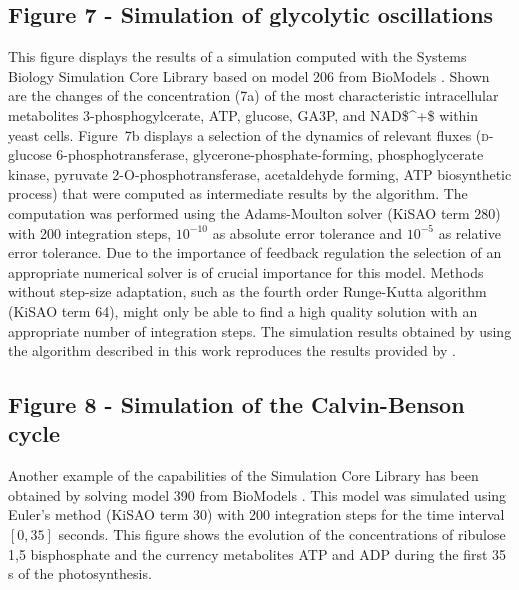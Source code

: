 \documentclass[10pt]{bmc_article}
\newenvironment{bmcformat}{\fussy\setboolean{publ}{true}}{\fussy}
\begin{document}
\begin{bmcformat}
\subsection*{Figure 7 - Simulation of glycolytic oscillations}
This figure displays the results of a simulation computed with the Systems
Biology Simulation Core Library based on model \COR{\numero} 206 from BioModels 
\cite{Novere2006a, Wolf2000}.
Shown are the changes of the concentration (7a) of the most characteristic
intracellular metabolites 3-phosphogylcerate, \acs{ATP}, glucose, \acf{GA3P},
and \acs{NAD$^+$} within yeast cells.
Figure~7b displays a selection of the dynamics of relevant fluxes 
(\textsc{d}-glucose 6-phosphotransferase, glycerone-phosphate-forming,
phosphoglycerate kinase, pyruvate 2-O-phosphotransferase, acetaldehyde forming,
\acs{ATP} biosynthetic process)
that were computed as intermediate results by the algorithm.
The computation was performed using the Adams-Moulton solver \cite{Hairer2000}
(\acs{KiSAO} term 280) with 200 integration steps, $10^{-10}$ as absolute error
tolerance and $10^{-5}$ as relative error tolerance.
Due to the importance of feedback regulation the selection of an appropriate
numerical solver is of crucial importance for this model.
Methods without step-size adaptation, such as the fourth order Runge-Kutta
algorithm (\acs{KiSAO} term 64), might only be able to find a high quality solution 
with an appropriate number of integration steps. 
The simulation results obtained by using the algorithm described in this work
reproduces the results provided by .

\subsection*{Figure 8 - Simulation of the Calvin-Benson cycle}
Another example of the capabilities of the Simulation Core Library has been
obtained by solving model \COR{\numero} 390 from BioModels  
\cite{Novere2006a, Arnold2011}.
This model was simulated using Euler's method (\acs{KiSAO} term 30) with 200
integration steps for the time interval $[0, 35]$ seconds.
This figure shows the evolution of the concentrations of ribulose 1,5
bisphosphate and the currency metabolites \acs{ATP} and \acs{ADP} during the first 35\,s of
the photosynthesis.



\end{bmcformat}
\end{document}
